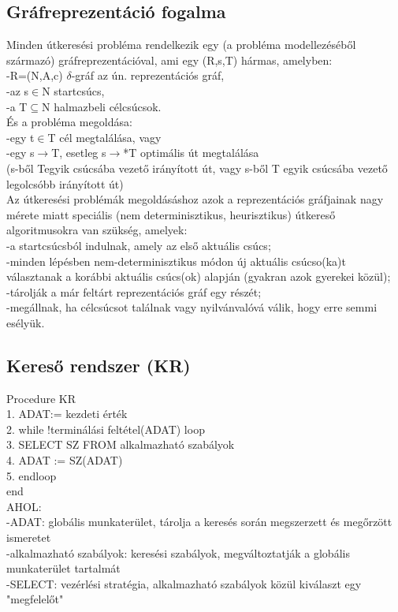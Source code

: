 \documentclass{article}
\begin{document}
	\newpage
	\subsection{Gráfreprezentáció fogalma}
	Minden útkeresési probléma rendelkezik egy (a probléma modellezéséből származó) gráfreprezentációval, ami egy (R,s,T) hármas, amelyben:\\
	-R=(N,A,c) $\delta$-gráf az ún. reprezentációs gráf,\\
	-az s$\in$N startcsúcs,\\
	-a T$\subseteq$N halmazbeli célcsúcsok.\\
	És a probléma megoldása:\\
	-egy t$\in$T cél megtalálása, vagy\\
	-egy s$\rightarrow$T, esetleg s$\rightarrow$*T optimális út megtalálása\\
	(s-ből Tegyik csúcsába vezető irányított út, vagy s-ből T egyik csúcsába vezető legolcsóbb irányított út)\\
	Az útkeresési problémák megoldásáshoz azok a reprezentációs gráfjainak nagy mérete miatt speciális (nem determinisztikus, heurisztikus) útkereső algoritmusokra van szükség, amelyek:\\
	-a startcsúcsból indulnak, amely az első aktuális csúcs;\\
	-minden lépésben nem-determinisztikus módon új aktuális csúcso(ka)t választanak a korábbi aktuális csúcs(ok) alapján (gyakran azok gyerekei közül);\\
	-tárolják a már feltárt reprezentációs gráf egy részét;\\
	-megállnak, ha célcsúcsot találnak vagy nyilvánvalóvá válik, hogy erre semmi esélyük.\\
	
	\subsection{Kereső rendszer (KR)}
	Procedure KR\\
	1. ADAT:= kezdeti érték\\
	2. while !terminálási feltétel(ADAT) loop\\
	3. \quad SELECT SZ FROM alkalmazható szabályok\\
	4. \quad ADAT := SZ(ADAT)\\
	5. endloop\\
	end\\
	AHOL:\\
	-ADAT: globális munkaterület, tárolja a keresés során megszerzett és megőrzött ismeretet\\
	-alkalmazható szabályok: keresési szabályok, megváltoztatják a globális munkaterület tartalmát\\
	-SELECT: vezérlési stratégia, alkalmazható szabályok közül kiválaszt egy "megfelelőt"
	
\end{document}
